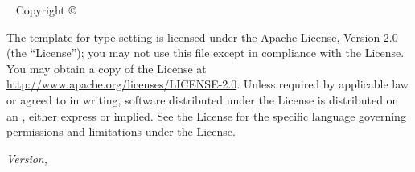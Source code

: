 %
%





\frontmatter

\blankpage

\newpage\thispagestyle{empty}
\vfill


\maketitle


\newpage
\begin{fullwidth}
~\vfill
\thispagestyle{empty}
\setlength{\parindent}{0pt}
\setlength{\parskip}{\baselineskip}
Copyright \copyright\ \the\year\ \thanklessauthor


\par{}

\par The template for type-setting is licensed under the Apache License, Version 2.0 (the ``License''); you may not
use this file except in compliance with the License. You may obtain a copy
of the License at \url{http://www.apache.org/licenses/LICENSE-2.0}. Unless
required by applicable law or agreed to in writing, software distributed
under the License is distributed on an , either express or implied. See the
License for the specific language governing permissions and limitations
under the License.

\par\textit{Version, \monthyear}
\end{fullwidth}

